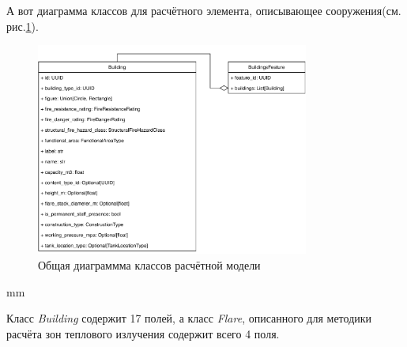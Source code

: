 А вот диаграмма классов для расчётного элемента, описывающее сооружения(см. рис.\ref{pic:implementation__model-feature}).
\begin{figure}[H]
	\includegraphics[width=0.8\textwidth]{implementation/pictures/model/feature}
	\caption{Общая диаграммма классов расчётной модели}
	\label{pic:implementation__model-feature}
\end{figure}
 mm

Класс \textit{Building} содержит 17 полей, а класс \textit{Flare}, описанного для методики расчёта
зон теплового излучения содержит всего 4 поля.
